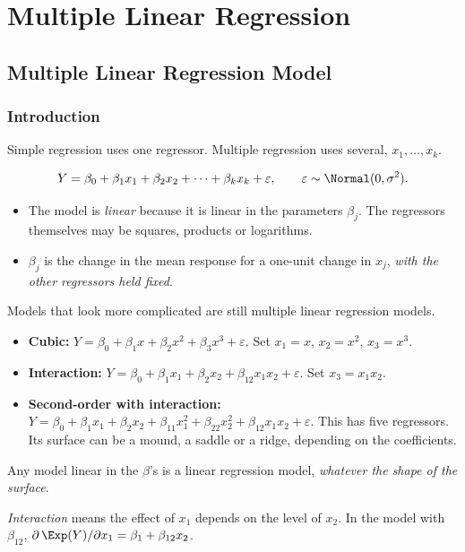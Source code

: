 \chapter{Multiple Linear Regression}

\section{Multiple Linear Regression Model}

\subsection{Introduction}

Simple regression uses one regressor. Multiple regression uses several, $x_1,\dots,x_k$.

\begin{definition}
\[ Y=\beta_0+\beta_1x_1+\beta_2x_2+\dots+\beta_kx_k+\varepsilon,\qquad\varepsilon\sim\Normal(0,\sigma^2). \]
\begin{itemize}
  \item The model is \emph{linear} because it is linear in the parameters $\beta_j$. The regressors themselves may be squares, products or logarithms.
  \item $\beta_j$ is the change in the mean response for a one-unit change in $x_j$, \emph{with the other regressors held fixed}.
\end{itemize}
\end{definition}

Models that look more complicated are still multiple linear regression models.
\begin{itemize}
  \item \textbf{Cubic:} $Y=\beta_0+\beta_1x+\beta_2x^2+\beta_3x^3+\varepsilon$. Set $x_1=x$, $x_2=x^2$, $x_3=x^3$.
  \item \textbf{Interaction:} $Y=\beta_0+\beta_1x_1+\beta_2x_2+\beta_{12}x_1x_2+\varepsilon$. Set $x_3=x_1x_2$.
  \item \textbf{Second-order with interaction:} $Y=\beta_0+\beta_1x_1+\beta_2x_2+\beta_{11}x_1^2+\beta_{22}x_2^2+\beta_{12}x_1x_2+\varepsilon$. This has five regressors. Its surface can be a mound, a saddle or a ridge, depending on the coefficients.
\end{itemize}
Any model linear in the $\beta$'s is a linear regression model, \emph{whatever the shape of the surface}.

\emph{Interaction} means the effect of $x_1$ depends on the level of $x_2$. In the model with $\beta_{12}$, $\partial\,\Exp(Y)/\partial x_1=\beta_1+\beta_{12}x_2$.

